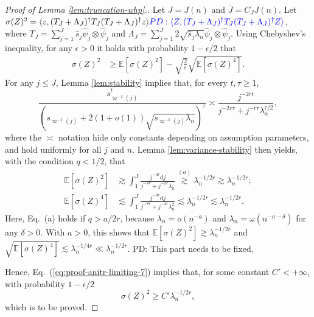 \documentclass[11pt,a4paper]{article}
\renewcommand{\hat}{\widehat}
\renewcommand{\bar}{\overline}
\theoremstyle{definition}
\theoremstyle{plain}
\theoremstyle{remark}
\newcommand{\ud}{\mathrm d}
\newcommand{\pd}[1]{
	{ \color{blue} PD: #1}
}
\begin{document}
\begin{proof}[Proof of Lemma \ref{lem:truncation-whp}.]
Let $J=J(n)$ and $\bar J=C_JJ(n)$.
Let $\sigma(Z)^2 = \langle z, (T_J+\Lambda_J)^\dagger T_J(T_J+\Lambda_J)^\dagger z\rangle \pd{\langle Z, (T_J+\Lambda_J)^\dagger T_J(T_J+\Lambda_J)^\dagger Z\rangle}$, where $T_J=\sum_{j=1}^J\hat s_j\hat\psi_j\otimes\hat\psi_j$
and $\Lambda_J = \sum_{j=1}^J 2\sqrt{\hat s_j\lambda_n}\hat\psi_j\otimes\hat\psi_j$.
Using Chebyshev's inequality, for any $\epsilon>0$ it holds with probability $1-\epsilon/2$ that
\begin{align}
\sigma(Z)^2 &\geq \mathbb E[\sigma(Z)^2] - \sqrt{\frac{2}{\epsilon}}\sqrt{\mathbb E[\sigma(Z)^4]}.
\label{eq:proof-anitr-limiting-7}
\end{align}
For any $j\leq J$, Lemma \ref{lem:stability} implies that, for every $t,\tau\geq 1$, 
$$
\frac{s_{\varpi^{-1}(j)}^t}{(s_{\varpi^{-1}(j)}+2(1+o(1))\sqrt{s_{\varpi^{-1}(j)}\lambda_n})^\tau} \asymp \frac{j^{-2rt}}{j^{-2r\tau}+j^{-r\tau}\lambda_n^{\tau/2}},
$$
where the $\asymp$ notation hide only constants depending on assumption parameters, and hold uniformly for all $j$ and $n$. Lemma \ref{lem:variance-stability} then yields,
with the condition $q<1/2$, that
\begin{align*}
\mathbb E[\sigma(Z)^2] &\gtrsim \int_1^J\frac{j^{-4r}\ud j}{j^{-4r}+j^{-2r}\lambda_n}\overset{(a)}{\gtrsim} \lambda_n^{-1/2r}  \gtrsim  \lambda_n^{-1/2r};\\
\mathbb E[\sigma(Z)^4] &\lesssim \int_1^J\frac{j^{-8r}\ud j}{j^{-8r}+j^{-4r}\lambda_n^2}
\lesssim \lambda_n^{-1/2r} \lesssim \lambda_n^{-1/2r}.
\end{align*}
Here, Eq.~(a) holds if $q>a/2r$, because $\lambda_n =o(n^{-a})$ and $\lambda_n=\omega(n^{-a-\delta})$ for any $\delta>0$.
With $a>0$, this shows that $\mathbb E[\sigma(Z)^2]\gtrsim\lambda_n^{-1/2r}$ and $\sqrt{\mathbb E[\sigma(Z)^4]}\lesssim \lambda_n^{-1/4r} \ll \lambda_n^{-1/2r}$. \pd{This part needs to be fixed.}
Hence, Eq.~(\ref{eq:proof-anitr-limiting-7}) implies that, for some constant $C'<+\infty$, with probability $1-\epsilon/2$ 
\begin{equation*}
\sigma(Z)^2 \geq C'\lambda_n^{-1/2r},
\end{equation*}
which is to be proved.

\end{proof}
\end{document}
